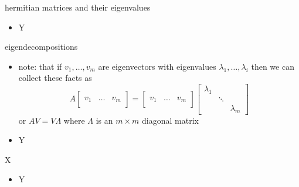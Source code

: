 \documentclass[10pt,hyperref]{beamer}
\newcommand{\trefmatrixtwo}[2]{\left[\begin{array}{c|c|c} & & \\ #1 & \dots & #2 \\ & & \end{array}\right]}
\begin{document}
\begin{frame}{hermitian matrices and their eigenvalues}

\begin{itemize}
\item Y
\end{itemize}
\end{frame}


\begin{frame}{eigendecompositions}

\begin{itemize}
\item note: that if $v_1,\dots,v_m$ are eigenvectors with eigenvalues $\lambda_1,\dots,\lambda_i$ then we can collect these facts as
    $$A \trefmatrixtwo{v_1}{v_m} =  \trefmatrixtwo{v_1}{v_m} \begin{bmatrix} \lambda_1 & & \\ & \ddots & \\ & & \lambda_m \end{bmatrix}$$
or \quad $A V = V \Lambda$ \quad where $\Lambda$ is an $m\times m$ diagonal matrix
\item Y
\end{itemize}
\end{frame}


\begin{frame}{X}

\begin{itemize}
\item Y
\end{itemize}
\end{frame}
\end{document}
